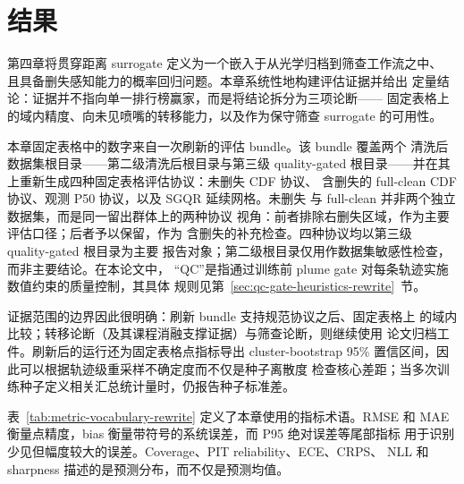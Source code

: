 \section{结果}

第四章将贯穿距离 surrogate 定义为一个嵌入于从光学归档到筛查工作流之中、
且具备删失感知能力的概率回归问题。本章系统性地构建评估证据并给出
定量结论：证据并不指向单一排行榜赢家，而是将结论拆分为三项论断——
固定表格上的域内精度、向未见喷嘴的转移能力，以及作为保守筛查
surrogate 的可用性。

本章固定表格中的数字来自一次刷新的评估 bundle。该 bundle 覆盖两个
清洗后数据集根目录——第二级清洗后根目录与第三级 quality-gated
根目录——并在其上重新生成四种固定表格评估协议：未删失 CDF 协议、
含删失的 full-clean CDF 协议、观测 P50 协议，以及 SGQR 延续网格。未删失
与 full-clean 并非两个独立数据集，而是同一留出群体上的两种协议
视角：前者排除右删失区域，作为主要评估口径；后者予以保留，作为
含删失的补充检查。四种协议均以第三级 quality-gated 根目录为主要
报告对象；第二级根目录仅用作数据集敏感性检查，而非主要结论。在本论文中，
“QC”是指通过训练前 plume gate 对每条轨迹实施数值约束的质量控制，其具体
规则见第~\ref{sec:qc-gate-heuristics-rewrite}~节。

证据范围的边界因此很明确：刷新 bundle 支持规范协议之后、固定表格上
的域内比较；转移论断（及其课程消融支撑证据）与筛查论断，则继续使用
论文归档工件。刷新后的运行还为固定表格点指标导出 cluster-bootstrap
95\% 置信区间，因此可以根据轨迹级重采样不确定度而不仅是种子离散度
检查核心差距；当多次训练种子定义相关汇总统计量时，仍报告种子标准差。

表~\ref{tab:metric-vocabulary-rewrite} 定义了本章使用的指标术语。RMSE 和
MAE 衡量点精度，bias 衡量带符号的系统误差，而 P95 绝对误差等尾部指标
用于识别少见但幅度较大的误差。Coverage、PIT reliability、ECE、CRPS、
NLL 和 sharpness 描述的是预测分布，而不仅是预测均值。

